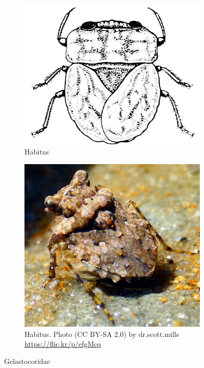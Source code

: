 \documentclass[letterpaper, 11pt]{article}
\begin{document}
\begin{figure}[ht!]
 \centering
 \begin{subfigure}[ht!]{0.35\textwidth}
  \includegraphics[width=\textwidth]{GelastocoridHabitusInk}
  \caption{Habitus \citep[][Plate XXXII, Fig. 10]{bhl82061}}
  \label{fig:gelasto1}
 \end{subfigure}
 \qquad
 \begin{subfigure}[ht!]{0.32\textwidth}
  \includegraphics[width=\textwidth]{GelastocoridHabitus}
  \caption{Habitus. Photo (CC BY-SA 2.0) by dr.scott.mills \url{https://flic.kr/p/efgMcq}}
  \label{fig:gelasto2}
 \end{subfigure}
 \caption{Gelastocoridae}\label{fig:gelastocorids}
\end{figure}
\end{document}
